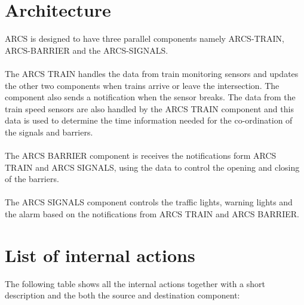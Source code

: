 \documentclass[10pt,a4paper]{article}
\begin{document}
\section{Architecture}
ARCS is designed to have three parallel components namely ARCS-TRAIN, ARCS-BARRIER and the ARCS-SIGNALS.\\
\\ The ARCS TRAIN handles the data from train monitoring sensors and updates the other two components when trains arrive or leave the intersection. The component also sends a notification when the sensor breaks. The data from the train speed sensors are also handled by the ARCS TRAIN component and this data is used to determine the time information needed for the co-ordination of the signals and barriers.\\
\\The ARCS BARRIER component is receives the notifications form ARCS TRAIN and ARCS SIGNALS, using the data to control the opening and closing of the barriers.\\
\\The ARCS SIGNALS component controls the traffic lights, warning lights and the alarm based on the notifications from ARCS TRAIN and ARCS BARRIER.

\newpage

\section{List of internal actions}
The following table shows all the internal actions together with a short description and the both the source and destination component:
\end{document}
